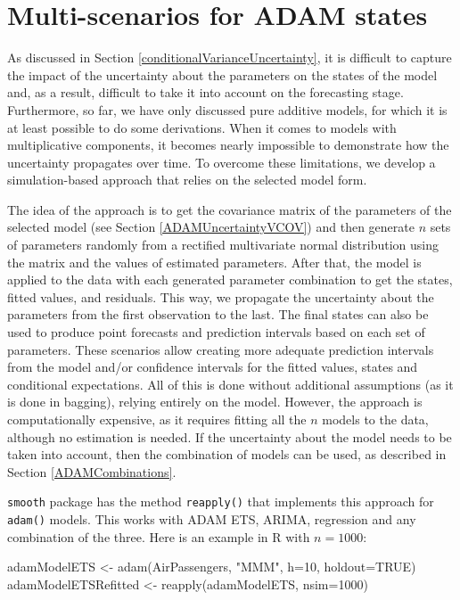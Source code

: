 \documentclass[
]{book}
\newenvironment{Shaded}{\begin{snugshade}}{\end{snugshade}}
\newcommand{\AttributeTok}[1]{\textcolor[rgb]{0.77,0.63,0.00}{#1}}
\newcommand{\ConstantTok}[1]{\textcolor[rgb]{0.00,0.00,0.00}{#1}}
\newcommand{\DecValTok}[1]{\textcolor[rgb]{0.00,0.00,0.81}{#1}}
\newcommand{\FunctionTok}[1]{\textcolor[rgb]{0.00,0.00,0.00}{#1}}
\newcommand{\NormalTok}[1]{#1}
\newcommand{\OtherTok}[1]{\textcolor[rgb]{0.56,0.35,0.01}{#1}}
\newcommand{\StringTok}[1]{\textcolor[rgb]{0.31,0.60,0.02}{#1}}
\theoremstyle{definition}
\theoremstyle{definition}
\theoremstyle{definition}
\theoremstyle{definition}
\theoremstyle{remark}
\begin{document}
\hypertarget{adamRefitted}{%
\section{Multi-scenarios for ADAM states}\label{adamRefitted}}

As discussed in Section \ref{conditionalVarianceUncertainty}, it is difficult to capture the impact of the uncertainty about the parameters on the states of the model and, as a result, difficult to take it into account on the forecasting stage. Furthermore, so far, we have only discussed pure additive models, for which it is at least possible to do some derivations. When it comes to models with multiplicative components, it becomes nearly impossible to demonstrate how the uncertainty propagates over time. To overcome these limitations, we develop a simulation-based approach that relies on the selected model form.

The idea of the approach is to get the covariance matrix of the parameters of the selected model (see Section \ref{ADAMUncertaintyVCOV}) and then generate \(n\) sets of parameters randomly from a rectified multivariate normal distribution using the matrix and the values of estimated parameters. After that, the model is applied to the data with each generated parameter combination to get the states, fitted values, and residuals. This way, we propagate the uncertainty about the parameters from the first observation to the last. The final states can also be used to produce point forecasts and prediction intervals based on each set of parameters. These scenarios allow creating more adequate prediction intervals from the model and/or confidence intervals for the fitted values, states and conditional expectations. All of this is done without additional assumptions (as it is done in bagging), relying entirely on the model. However, the approach is computationally expensive, as it requires fitting all the \(n\) models to the data, although no estimation is needed. If the uncertainty about the model needs to be taken into account, then the combination of models can be used, as described in Section \ref{ADAMCombinations}.

\texttt{smooth} package has the method \texttt{reapply()} that implements this approach for \texttt{adam()} models. This works with ADAM ETS, ARIMA, regression and any combination of the three. Here is an example in R with \(n=1000\):

\begin{Shaded}
\begin{Highlighting}[]
\NormalTok{adamModelETS }\OtherTok{\textless{}{-}} \FunctionTok{adam}\NormalTok{(AirPassengers, }\StringTok{"MMM"}\NormalTok{, }\AttributeTok{h=}\DecValTok{10}\NormalTok{, }\AttributeTok{holdout=}\ConstantTok{TRUE}\NormalTok{)}
\NormalTok{adamModelETSRefitted }\OtherTok{\textless{}{-}} \FunctionTok{reapply}\NormalTok{(adamModelETS, }\AttributeTok{nsim=}\DecValTok{1000}\NormalTok{)}
\end{Highlighting}
\end{Shaded}
\end{document}
